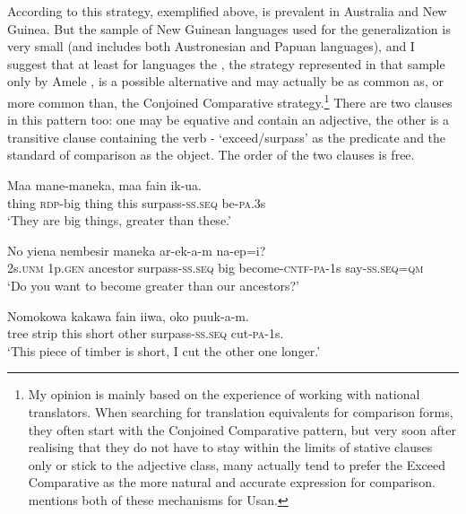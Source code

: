 According to \citet{Stassen2008} this  strategy, exemplified above, is prevalent in  Australia and New Guinea. But the sample of New Guinean languages used for the generalization is very small (and includes both Austronesian and Papuan languages), and I suggest that at least for  languages the , the strategy represented in that sample only by Amele \citep[134--135]{Roberts1987}, is a possible alternative and may actually be as common as, or more common than, the Conjoined Comparative strategy.\footnote{My opinion is mainly based on the experience of working with national translators. When searching for translation equivalents for comparison forms, they often start with the Conjoined Comparative pattern, but very soon after realising that they do not have to stay within the limits of stative clauses only or stick to the adjective class, many actually tend to prefer the Exceed Comparative as the more natural and accurate expression for comparison.  \citet[68]{Reesink1987} mentions both of these mechanisms for Usan. }   There are two clauses in this pattern too: one may be equative and contain an adjective, the other is a transitive clause containing the verb - `exceed/surpass' as the predicate and the standard of comparison as the object. The order of the two clauses is free.

\ea%
\label{ex:x1327}
\gll Maa  mane-maneka,  maa  fain    ik-ua. \\
thing  \textsc{rdp}-big  thing  this  surpass-\textsc{ss}.\textsc{seq}  be-\textsc{pa}.3s\\
\glt `They are big things, greater than these.'
\z

\ea%
\label{ex:x1328}
\gll No  yiena  nembesir    maneka ar-ek-a-m  na-ep=i?\\
2s.\textsc{unm}  1p.\textsc{gen}  ancestor  surpass-\textsc{ss}.\textsc{seq}  big become-\textsc{cntf}-\textsc{pa}-1s  say-\textsc{ss}.\textsc{seq}=\textsc{qm}\\
\glt `Do you want to become greater than our ancestors?'
\z

\ea%
\label{ex:x1333}
\gll Nomokowa  kakawa  fain  iiwa,  oko    puuk-a-m. \\
tree  strip  this  short  other  surpass-\textsc{ss}.\textsc{seq}  cut-\textsc{pa}-1s.\\
\glt `This piece of timber is short, I cut the other one longer.'
\z

